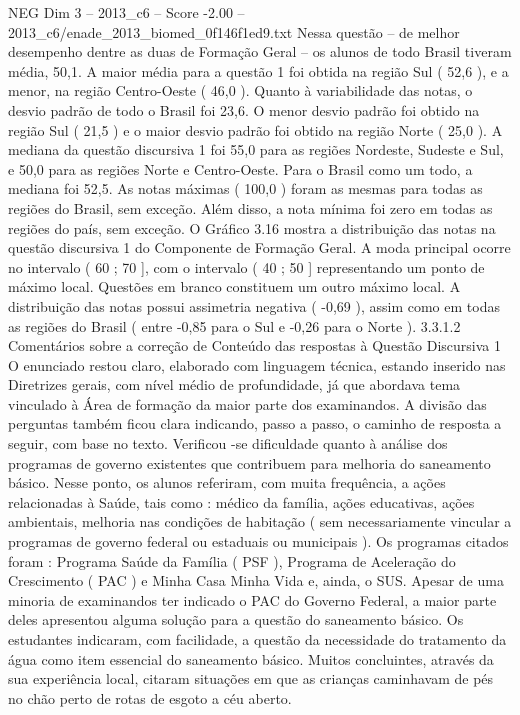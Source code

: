 \begin{textsample}{NEG Dim 3 – 2013\_c6 – Score -2.00 – 2013\_c6/enade\_2013\_biomed\_0f146f1ed9.txt}
Nessa questão – de melhor desempenho dentre as duas de Formação Geral – os alunos de todo Brasil tiveram média, 50,1.
A maior média para a questão 1 foi obtida na região Sul ( 52,6 ), e a menor, na região Centro-Oeste ( 46,0 ).
Quanto à variabilidade das notas, o desvio padrão de todo o Brasil foi 23,6.
O menor desvio padrão foi obtido na região Sul ( 21,5 ) e o maior desvio padrão foi obtido na região Norte ( 25,0 ).
A mediana da questão discursiva 1 foi 55,0 para as regiões Nordeste, Sudeste e Sul, e 50,0 para as regiões Norte e Centro-Oeste.
Para o Brasil como um todo, a mediana foi 52,5.
As notas máximas ( 100,0 ) foram as mesmas para todas as regiões do Brasil, sem exceção.
Além disso, a nota mínima foi zero em todas as regiões do país, sem exceção.
O Gráfico 3.16 mostra a distribuição das notas na questão discursiva 1 do Componente de Formação Geral.
A moda principal ocorre no intervalo ( 60 ; 70 ], com o intervalo ( 40 ; 50 ] representando um ponto de máximo local.
Questões em branco constituem um outro máximo local.
A distribuição das notas possui assimetria negativa ( -0,69 ), assim como em todas as regiões do Brasil ( entre -0,85 para o Sul e -0,26 para o Norte ). 3.3.1.2 Comentários sobre a correção de Conteúdo das respostas à Questão Discursiva 1 O enunciado restou claro, elaborado com linguagem técnica, estando inserido nas Diretrizes gerais, com nível médio de profundidade, já que abordava tema vinculado à Área de formação da maior parte dos examinandos.
A divisão das perguntas também ficou clara indicando, passo a passo, o caminho de resposta a seguir, com base no texto.
Verificou -se dificuldade quanto à análise dos programas de governo existentes que contribuem para melhoria do saneamento básico.
Nesse ponto, os alunos referiram, com muita frequência, a ações relacionadas à Saúde, tais como : médico da família, ações educativas, ações ambientais, melhoria nas condições de habitação ( sem necessariamente vincular a programas de governo federal ou estaduais ou municipais ).
Os programas citados foram : Programa Saúde da Família ( PSF ), Programa de Aceleração do Crescimento ( PAC ) e Minha Casa Minha Vida e, ainda, o SUS.
Apesar de uma minoria de examinandos ter indicado o PAC do Governo Federal, a maior parte deles apresentou alguma solução para a questão do saneamento básico.
Os estudantes indicaram, com facilidade, a questão da necessidade do tratamento da água como item essencial do saneamento básico.
Muitos concluintes, através da sua experiência local, citaram situações em que as crianças caminhavam de pés no chão perto de rotas de esgoto a céu aberto.

\end{textsample}

